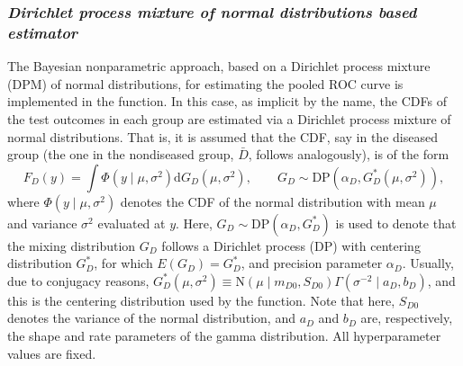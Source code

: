 \subsubsection{\textit{Dirichlet process mixture of normal distributions based estimator}}
The Bayesian nonparametric approach, based on a Dirichlet process mixture (DPM) of normal distributions, for estimating the pooled ROC curve \citep{Erkanli2006} is implemented in the  function. In this case, as implicit by the name, the CDFs of the test outcomes in each group are estimated via a Dirichlet process mixture of normal distributions. That is, it is assumed that the CDF, say in the diseased group (the one in the nondiseased group, $\bar{D}$, follows analogously), is of the form
\begin{equation}\label{cdfdpm1}
F_{D}(y)=\int \Phi(y\mid \mu,\sigma^2)\text{d}G_{D}(\mu,\sigma^2), \qquad G_D\sim\text{DP}(\alpha_D,G_D^{*}(\mu,\sigma^2)),
\end{equation}
where $\Phi(y\mid \mu,\sigma^2)$ denotes the CDF of the normal distribution with mean $\mu$ and variance $\sigma^2$ evaluated at $y$. Here, $G_D\sim\text{DP}(\alpha_D,G_D^{*})$ is used to denote that the mixing distribution $G_D$ follows a Dirichlet process (DP) \citep{Ferguson73} with centering distribution $G_D^{*}$, for which $E(G_D)=G_D^{*}$, and precision parameter $\alpha_D$. Usually, due to conjugacy reasons, $G_D^{*}(\mu,\sigma^2)\equiv \text{N}(\mu\mid m_{D0},S_{D0})\Gamma(\sigma^{-2}\mid a_D,b_D)$, and this is the centering distribution used by the  function. Note that here, $S_{D0}$ denotes the variance of the normal distribution, and $a_D$ and $b_D$ are, respectively, the shape and rate parameters of the gamma distribution. All hyperparameter values are fixed.

